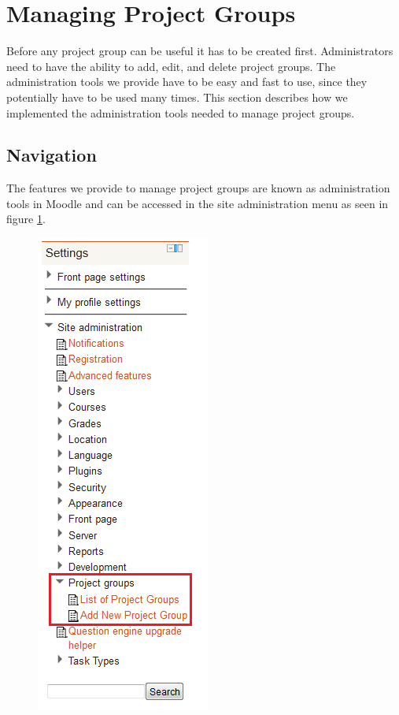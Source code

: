 \section{Managing Project Groups}
Before any project group can be useful it has to be created first.
Administrators need to have the ability to add, edit, and delete project groups.
The administration tools we provide have to be easy and fast to use, since they potentially have to be used many times.
This section describes how we implemented the administration tools needed to manage project groups.

\subsection{Navigation}
The features we provide to manage project groups are known as administration tools in Moodle and can be accessed in the site administration menu as seen in figure \ref{fig:navigation}.

\begin{figure}
	\centering
		\includegraphics[scale=0.75]{images/admin-navigation.png}
	\label{fig:navigation}
\end{figure}